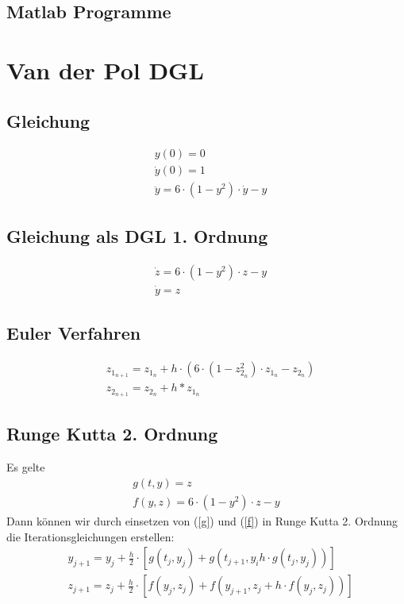 \documentclass[10pt]{scrartcl}
\begin{document}
\subsection{Matlab Programme}
	
	


\section{Van der Pol DGL}
	\subsection{Gleichung}
		\begin{align}
		&y(0) = 0\\
		&\dot{y}(0) = 1\\
		&\ddot{y} = 6 \cdot (1-y^2) \cdot \dot{y} -y
		\end{align}
	\subsection{Gleichung als DGL 1. Ordnung}
		\begin{align}
			&\dot{z} = 6 \cdot (1-y^2) \cdot z - y\\
			&\dot{y} = z
		\end{align}
		
	\subsection{Euler Verfahren}
	\begin{align}
		&z_{1_{n+1}} = z_{1_{n}} + h \cdot (6 \cdot (1-z_{2_{n}}^2) \cdot z_{1_{n}} - z_{2_{n}})\\
		&z_{2_{n+1}} = z_{2_n} + h * z_{1_n}
	\end{align}
	
	
	\subsection{Runge Kutta 2. Ordnung}
	Es gelte	
	\begin{align}
		g(t,y) = z \label{g}\\		
		f(y,z) = 6 \cdot (1-y^2) \cdot z - y \label{f}
	\end{align}
	Dann können wir durch einsetzen von (\ref{g}) und (\ref{f}) in Runge Kutta 2. Ordnung die Iterationsgleichungen erstellen:
	\begin{align}
		&y_{j+1}=y_j + \frac{h}{2} \cdot [g(t_j, y_j) + g(t_{j+1}, y_i h \cdot g(t_j, y_j))]\\
		&z_{j+1}=z_j + \frac{h}{2} \cdot [f(y_j, z_j) + f(y_{j+1}, z_j + h \cdot f(y_j, z_j))]
	\end{align} 
	
\end{document}
